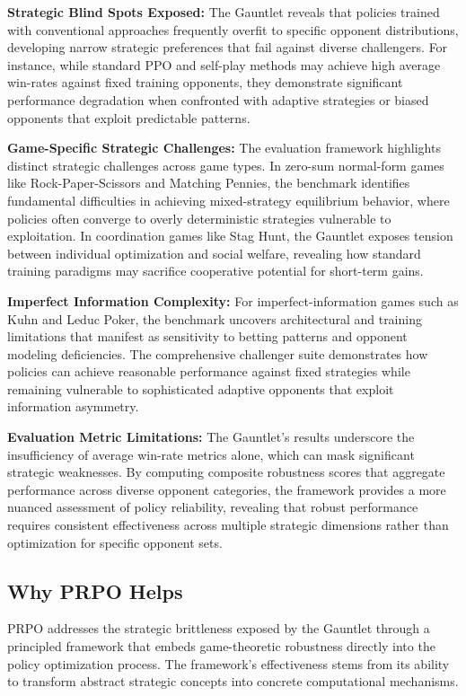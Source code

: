 \documentclass[sigconf,anonymous]{aamas}
\begin{document}
\textbf{Strategic Blind Spots Exposed:} The Gauntlet reveals that policies trained with conventional approaches frequently overfit to specific opponent distributions, developing narrow strategic preferences that fail against diverse challengers. For instance, while standard PPO and self-play methods may achieve high average win-rates against fixed training opponents, they demonstrate significant performance degradation when confronted with adaptive strategies or biased opponents that exploit predictable patterns.

\textbf{Game-Specific Strategic Challenges:} The evaluation framework highlights distinct strategic challenges across game types. In zero-sum normal-form games like Rock-Paper-Scissors and Matching Pennies, the benchmark identifies fundamental difficulties in achieving mixed-strategy equilibrium behavior, where policies often converge to overly deterministic strategies vulnerable to exploitation. In coordination games like Stag Hunt, the Gauntlet exposes tension between individual optimization and social welfare, revealing how standard training paradigms may sacrifice cooperative potential for short-term gains.

\textbf{Imperfect Information Complexity:} For imperfect-information games such as Kuhn and Leduc Poker, the benchmark uncovers architectural and training limitations that manifest as sensitivity to betting patterns and opponent modeling deficiencies. The comprehensive challenger suite demonstrates how policies can achieve reasonable performance against fixed strategies while remaining vulnerable to sophisticated adaptive opponents that exploit information asymmetry.

\textbf{Evaluation Metric Limitations:} The Gauntlet's results underscore the insufficiency of average win-rate metrics alone, which can mask significant strategic weaknesses. By computing composite robustness scores that aggregate performance across diverse opponent categories, the framework provides a more nuanced assessment of policy reliability, revealing that robust performance requires consistent effectiveness across multiple strategic dimensions rather than optimization for specific opponent sets.

\subsection{Why PRPO Helps}

PRPO addresses the strategic brittleness exposed by the Gauntlet through a principled framework that embeds game-theoretic robustness directly into the policy optimization process. The framework's effectiveness stems from its ability to transform abstract strategic concepts into concrete computational mechanisms.
\end{document}
